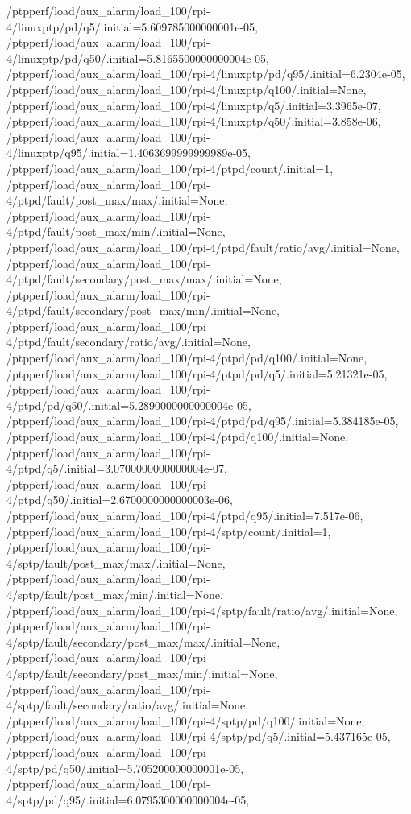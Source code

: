 {    /ptpperf/load/aux_alarm/load_100/rpi-4/linuxptp/pd/q5/.initial=5.609785000000001e-05,
    /ptpperf/load/aux_alarm/load_100/rpi-4/linuxptp/pd/q50/.initial=5.8165500000000004e-05,
    /ptpperf/load/aux_alarm/load_100/rpi-4/linuxptp/pd/q95/.initial=6.2304e-05,
    /ptpperf/load/aux_alarm/load_100/rpi-4/linuxptp/q100/.initial=None,
    /ptpperf/load/aux_alarm/load_100/rpi-4/linuxptp/q5/.initial=3.3965e-07,
    /ptpperf/load/aux_alarm/load_100/rpi-4/linuxptp/q50/.initial=3.858e-06,
    /ptpperf/load/aux_alarm/load_100/rpi-4/linuxptp/q95/.initial=1.4063699999999989e-05,
    /ptpperf/load/aux_alarm/load_100/rpi-4/ptpd/count/.initial=1,
    /ptpperf/load/aux_alarm/load_100/rpi-4/ptpd/fault/post_max/max/.initial=None,
    /ptpperf/load/aux_alarm/load_100/rpi-4/ptpd/fault/post_max/min/.initial=None,
    /ptpperf/load/aux_alarm/load_100/rpi-4/ptpd/fault/ratio/avg/.initial=None,
    /ptpperf/load/aux_alarm/load_100/rpi-4/ptpd/fault/secondary/post_max/max/.initial=None,
    /ptpperf/load/aux_alarm/load_100/rpi-4/ptpd/fault/secondary/post_max/min/.initial=None,
    /ptpperf/load/aux_alarm/load_100/rpi-4/ptpd/fault/secondary/ratio/avg/.initial=None,
    /ptpperf/load/aux_alarm/load_100/rpi-4/ptpd/pd/q100/.initial=None,
    /ptpperf/load/aux_alarm/load_100/rpi-4/ptpd/pd/q5/.initial=5.21321e-05,
    /ptpperf/load/aux_alarm/load_100/rpi-4/ptpd/pd/q50/.initial=5.2890000000000004e-05,
    /ptpperf/load/aux_alarm/load_100/rpi-4/ptpd/pd/q95/.initial=5.384185e-05,
    /ptpperf/load/aux_alarm/load_100/rpi-4/ptpd/q100/.initial=None,
    /ptpperf/load/aux_alarm/load_100/rpi-4/ptpd/q5/.initial=3.0700000000000004e-07,
    /ptpperf/load/aux_alarm/load_100/rpi-4/ptpd/q50/.initial=2.6700000000000003e-06,
    /ptpperf/load/aux_alarm/load_100/rpi-4/ptpd/q95/.initial=7.517e-06,
    /ptpperf/load/aux_alarm/load_100/rpi-4/sptp/count/.initial=1,
    /ptpperf/load/aux_alarm/load_100/rpi-4/sptp/fault/post_max/max/.initial=None,
    /ptpperf/load/aux_alarm/load_100/rpi-4/sptp/fault/post_max/min/.initial=None,
    /ptpperf/load/aux_alarm/load_100/rpi-4/sptp/fault/ratio/avg/.initial=None,
    /ptpperf/load/aux_alarm/load_100/rpi-4/sptp/fault/secondary/post_max/max/.initial=None,
    /ptpperf/load/aux_alarm/load_100/rpi-4/sptp/fault/secondary/post_max/min/.initial=None,
    /ptpperf/load/aux_alarm/load_100/rpi-4/sptp/fault/secondary/ratio/avg/.initial=None,
    /ptpperf/load/aux_alarm/load_100/rpi-4/sptp/pd/q100/.initial=None,
    /ptpperf/load/aux_alarm/load_100/rpi-4/sptp/pd/q5/.initial=5.437165e-05,
    /ptpperf/load/aux_alarm/load_100/rpi-4/sptp/pd/q50/.initial=5.705200000000001e-05,
    /ptpperf/load/aux_alarm/load_100/rpi-4/sptp/pd/q95/.initial=6.0795300000000004e-05,
}
